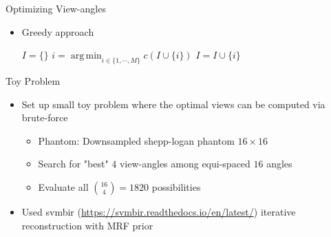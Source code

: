\documentclass[english,aspectratio=43]{beamer}
\DeclareMathOperator*{\argmin}{arg\,min}
\begin{document}
\begin{frame}{Optimizing View-angles}
	\begin{itemize}
	    \setlength\itemsep{2em}
		\item Greedy approach
		
		\begin{algorithm}[H]
        \begin{algorithmic}[1]
        \STATE $I = \{\}$
            \STATE  $i = \argmin_{i \in \{1,\cdots,M \} } c(I \cup \{ i \})$
            \STATE $I = I \cup \{ i \}$
        \ENDWHILE
        
        \end{algorithmic}
        \label{alg:angle_greedy}
        \end{algorithm}
        
	\end{itemize}
	
\end{frame}


\begin{frame}{Toy Problem}
	\begin{itemize}
	    \setlength\itemsep{2em}
		\item Set up small toy problem where the optimal views can be computed via brute-force
		\begin{itemize}
		    \item Phantom: Downsampled shepp-logan phantom $16\times16$
		    \item Search for "best" $4$ view-angles among equi-spaced $16$ angles
		    \item Evaluate all ${16 \choose 4} = 1820$ possibilities
	    \end{itemize}
		
		
	    \item Used svmbir (\url{https://svmbir.readthedocs.io/en/latest/}) iterative reconstruction with MRF prior
	    
        
	\end{itemize}
	
\end{frame}
\end{document}

